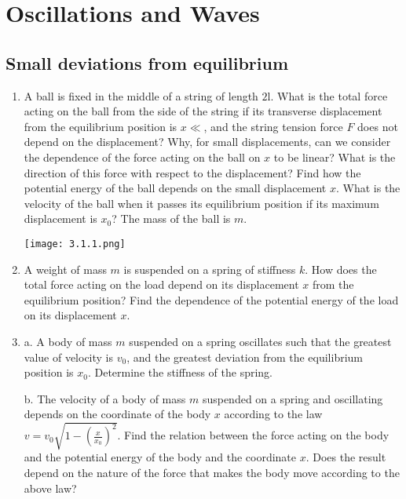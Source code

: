 \documentclass{article}
\begin{document}
\section{Oscillations and Waves}

\subsection{Small deviations from equilibrium}

\begin{enumerate}[label=3.1.\arabic*]

\item A ball is fixed in the middle of a string of length $2$l. What is the total force acting on the ball from the side of the string if its transverse displacement from the equilibrium position is $x \ll $, and the string tension force $F$ does not depend on the displacement? Why, for small displacements, can we consider the dependence of the force acting on the ball on $x$ to be linear? What is the direction of this force with respect to the displacement? Find how the potential energy of the ball depends on the small displacement $x$. What is the velocity of the ball when it passes its equilibrium position if its maximum displacement is $x_0$? The mass of the ball is $m$.

\begin{center}
    \texttt{[image: 3.1.1.png]}
\end{center}

\item A weight of mass $m$ is suspended on a spring of stiffness $k$. How does the total force acting on the load depend on its displacement $x$ from the equilibrium position? Find the dependence of the potential energy of the load on its displacement $x$.

\item a. A body of mass $m$ suspended on a spring oscillates such that the greatest value of velocity is $v_0$, and the greatest deviation from the equilibrium position is $x_0$. Determine the stiffness of the spring.

b. The velocity of a body of mass $m$ suspended on a spring and oscillating depends on the coordinate of the body $x$ according to the law $v = v_0 \sqrt{ 1 - (\frac{x}{x_0})^2}$. Find the relation between the force acting on the body and the potential energy of the body and the coordinate $x$. Does the result depend on the nature of the force that makes the body move according to the above law?


\end{enumerate}
\end{document}
